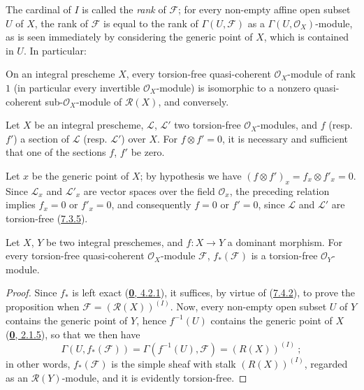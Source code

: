 The cardinal of $I$ is called the \emph{rank} of $\mathscr{F}$; for every
non-empty affine open subset $U$ of $X$, the rank of $\mathscr{F}$ is equal
to the rank of $\Gamma(U,\mathscr{F})$ as a $\Gamma(U,\mathscr{O}_X)$-module,
as is seen immediately by considering the generic point of $X$, which is
contained in $U$. In particular:

\begin{corollary}[7.4.3]
\label{I.7.4.3}
On an integral prescheme $X$, every torsion-free quasi-coherent
$\mathscr{O}_X$-module of rank $1$ (in particular every invertible
$\mathscr{O}_X$-module) is isomorphic to a nonzero quasi-coherent
sub-$\mathscr{O}_X$-module of $\mathscr{R}(X)$, and conversely.
\end{corollary}

\begin{corollary}[7.4.4]
\label{I.7.4.4}
Let $X$ be an integral prescheme, $\mathscr{L}$, $\mathscr{L}'$ two
torsion-free $\mathscr{O}_X$-modules, and $f$ \textup{(resp. $f'$)} a section of
$\mathscr{L}$ \textup{(resp. $\mathscr{L}'$)} over $X$. For
$f\otimes f'=0$, it is necessary and sufficient that one of the sections $f$,
$f'$ be zero.
\end{corollary}

Let $x$ be the generic point of $X$; by hypothesis we have
$(f\otimes f')_x=f_x\otimes f'_x=0$. Since $\mathscr{L}_x$ and
$\mathscr{L}'_x$ are vector spaces over the field
$\mathscr{O}_x$, the preceding relation implies $f_x=0$ or $f'_x=0$, and
consequently $f=0$ or $f'=0$, since $\mathscr{L}$ and $\mathscr{L}'$ are
torsion-free (\hyperref[I.7.3.5]{7.3.5}).

\begin{proposition}[7.4.5]
\label{I.7.4.5}
Let $X$, $Y$ be two integral preschemes, and $f:X\to Y$ a dominant morphism.
For every torsion-free quasi-coherent $\mathscr{O}_X$-module $\mathscr{F}$,
$f_*(\mathscr{F})$ is a torsion-free $\mathscr{O}_Y$-module.
\end{proposition}

\begin{proof}
Since $f_*$ is left exact
(\hyperref[0.4.2.1]{\textbf{0}, 4.2.1}), it suffices, by virtue of
(\hyperref[I.7.4.2]{7.4.2}), to prove the proposition when
$\mathscr{F}=(\mathscr{R}(X))^{(I)}$. Now, every non-empty open subset $U$ of
$Y$ contains the generic point of $Y$, hence $f^{-1}(U)$ contains the generic
point of $X$ (\hyperref[0.2.1.5]{\textbf{0}, 2.1.5}), so that we then have
\[
  \Gamma(U,f_*(\mathscr{F}))
  =\Gamma(f^{-1}(U),\mathscr{F})=(R(X))^{(I)}~;
\]
in other words, $f_*(\mathscr{F})$ is the simple sheaf with stalk
$(R(X))^{(I)}$, regarded as an $\mathscr{R}(Y)$-module, and it is evidently
torsion-free.
\end{proof}

